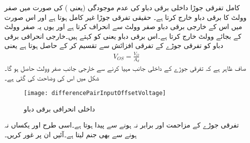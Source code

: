  
کامل تفرقی جوڑا داخلی برقی دباو کی عدم موجودگی (یعنی  ) کی صورت میں صفر وولٹ کا برقی دباو خارج کرتا ہے۔ حقیقی تفرقی جوڑا غیر کامل ہوتا ہے اور اس صورت میں اس کے خارجی برقی دباو صفر وولٹ سے انحراف کرتا ہے اور یوں یہ صفر وولٹ کے بجائے  وولٹ خارج کرتا ہے۔اس برقی دباو یعنی   کو   کہتے ہیں۔خارجی انحرافی برقی دباو کو تفرقی جوڑے کے تفرقی افزائش  سے تقسیم کر کے    حاصل ہوتا ہے یعنی
\begin{align}
V_{OS}=\frac{V_O}{A_d}
\end{align}
صاف ظاہر ہے کہ تفرقی جوڑے کے داخلی جانب  مہیا کرنے سے خارجی جانب صفر وولٹ حاصل ہو گا۔شکل   میں اس کی وضاحت کی گئی ہے۔
\begin{figure}
\centering
\texttt{[image: differencePairInputOffsetVoltage]}
\caption{داخلی انحرافی برقی دباو}
\label{شکل_تفرقی_جوڑے_کی_داخلی_انحرافی_برقی_دباو}
\end{figure}
 تفرقی جوڑے کے مزاحمت  اور  برابر نہ ہونے سے پیدا ہوتا ہے۔اسی طرح  اور  یکساں نہ ہونے سے بھی  جنم لیتا ہے۔آئیں ان پر غور کریں۔

